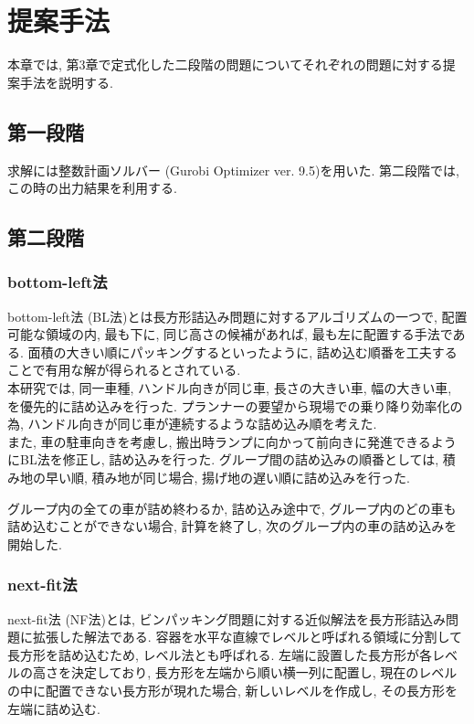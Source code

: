 \chapter{提案手法}\label{method}
本章では, 第3章で定式化した二段階の問題についてそれぞれの問題に対する提案手法を説明する. 

\section{第一段階}
求解には整数計画ソルバー (Gurobi Optimizer ver. 9.5)を用いた. 
第二段階では, この時の出力結果を利用する.  

\section{第二段階}
\subsection*{bottom-left法}
bottom-left法 (BL法)とは長方形詰込み問題に対するアルゴリズムの一つで, 配置可能な領域の内, 最も下に, 同じ高さの候補があれば, 最も左に配置する手法である\cite{nfp2}. 
面積の大きい順にパッキングするといったように, 詰め込む順番を工夫することで有用な解が得られるとされている. \\

本研究では, 同一車種, ハンドル向きが同じ車, 長さの大きい車, 幅の大きい車, を優先的に詰め込みを行った. 
プランナーの要望から現場での乗り降り効率化の為, ハンドル向きが同じ車が連続するような詰め込み順を考えた. \\
また, 車の駐車向きを考慮し, 搬出時ランプに向かって前向きに発進できるようにBL法を修正し, 詰め込みを行った. 
グループ間の詰め込みの順番としては, 積み地の早い順, 積み地が同じ場合, 揚げ地の遅い順に詰め込みを行った. 

グループ内の全ての車が詰め終わるか, 詰め込み途中で, グループ内のどの車も詰め込むことができない場合, 計算を終了し, 次のグループ内の車の詰め込みを開始した. 

\subsection*{next-fit法}
next-fit法 (NF法)とは, ビンパッキング問題に対する近似解法を長方形詰込み問題に拡張した解法である\cite{next-fit}. 
容器を水平な直線でレベルと呼ばれる領域に分割して長方形を詰め込むため, レベル法とも呼ばれる. 
左端に設置した長方形が各レベルの高さを決定しており, 長方形を左端から順い横一列に配置し, 現在のレベルの中に配置できない長方形が現れた場合, 新しいレベルを作成し, その長方形を左端に詰め込む. \\


